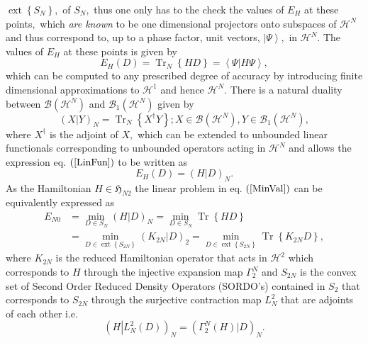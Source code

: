 \documentclass[aps,preprint]{revtex4}%
\begin{document}
$\operatorname*{ext}\left\{  S_{N}\right\}  ,$ of $S_{N},$ thus one only has
to the check the values of $E_{H}$ at these points$,$ which \emph{are known}
to be one dimensional projectors onto subspaces of $\mathcal{H}^{N}$ and thus
correspond to, up to a phase factor, unit vectors, $\left\vert \Psi
\right\rangle ,$ in $\mathcal{H}^{N}.$ The values of $E_{H}$ at these points
is given by
\begin{equation}
E_{H}\left(  D\right)  =\operatorname*{Tr}\nolimits_{N}\left\{  HD\right\}
=\left\langle \left.  \Psi\right\vert H\Psi\right\rangle , \label{Enval}%
\end{equation}
which can be computed to any prescribed degree of accuracy by introducing
finite dimensional approximations to $\mathcal{H}^{1}$ and hence
$\mathcal{H}^{N}$. There is a natural duality between $\mathcal{B}\left(
\mathcal{H}^{N}\right)  $ and $\mathcal{B}_{1}\left(  \mathcal{H}^{N}\right)
$ given by
\begin{equation}
\left(  X\left\vert Y\right.  \right)  _{N}=\operatorname*{Tr}\nolimits_{N}%
\left\{  X^{\dagger}Y\right\}  ;X\in\mathcal{B}\left(  \mathcal{H}^{N}\right)
,Y\in\mathcal{B}_{1}\left(  \mathcal{H}^{N}\right)  ,
\end{equation}
where $X^{\dagger}$ is the adjoint of $X,$ which can be extended to unbounded
linear functionals corresponding to unbounded operators acting in
$\mathcal{H}^{N}$ and allows the expression eq. $\left(  \ref{LinFun}\right)
$ to be written as
\begin{equation}
E_{H}\left(  D\right)  =\left(  H\left\vert D\right.  \right)  _{N}.
\end{equation}
As the Hamiltonian $H\in\mathfrak{H}_{N2}$ the linear problem in eq. $\left(
\ref{MinVal}\right)  $ can be equivalently expressed as
\begin{align}
E_{N0}  &  =\min_{D\in S_{N}}\left(  H\left\vert D\right.  \right)  _{N}%
=\min_{D\in S_{N}}\operatorname*{Tr}\left\{  HD\right\} \label{MinVal2}\\
&  =\min_{D\in\operatorname*{ext}\left\{  S_{2N}\right\}  }\left(
K_{2N}\left\vert D\right.  \right)  _{2}=\min_{D\in\operatorname*{ext}\left\{
S_{2N}\right\}  }\operatorname*{Tr}\left\{  K_{2N}D\right\}  ,
\end{align}
where $K_{2N}$ is the reduced Hamiltonian operator that acts in $\mathcal{H}%
^{2}$ which corresponds to $H$ through the injective expansion map $\Gamma
_{2}^{N}$ and $S_{2N}$ is the convex set of Second Order Reduced Density
Operators (SORDO's) contained in $S_{2}$ that corresponds to $S_{2N}$ through
the surjective contraction map $L_{N}^{2}$ that are adjoints of each other
i.e.
\begin{equation}
\left(  H\left\vert L_{N}^{2}\left(  D\right)  \right.  \right)  _{N}=\left(
\Gamma_{2}^{N}\left(  H\right)  \left\vert D\right.  \right)  _{N}.
\end{equation}
\end{document}
